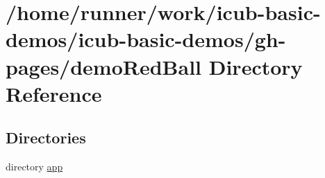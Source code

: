 \section{/home/runner/work/icub-\/basic-\/demos/icub-\/basic-\/demos/gh-\/pages/demo\+Red\+Ball Directory Reference}
\label{dir_24edfe2b9091337dacb04c2225681c6a}
\subsection*{Directories}
\begin{DoxyCompactItemize}
\item 
directory \hyperlink{dir_09c3d1dd163a66c44752029483303db0}{app}
\end{DoxyCompactItemize}
